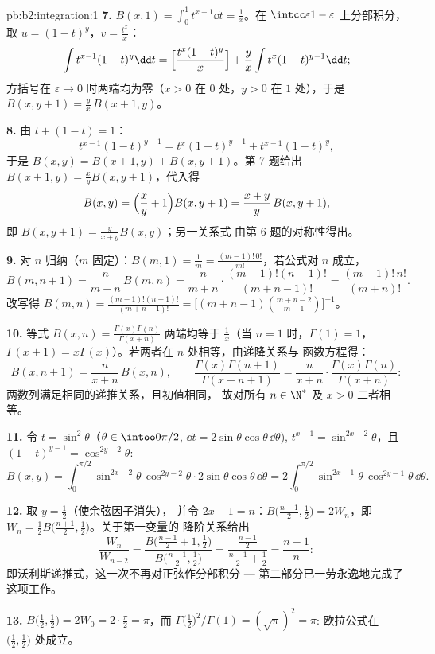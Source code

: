 \begin{solution}{pb:b2:integration:1}
\textbf{7.} $B(x,1) = \int_0^1 t^{x-1}\dd t = \frac1x$。在
$\intcc\varepsilon{1-\varepsilon}$ 上分部积分，取 $u = (1-t)^y$，$v =
\frac{t^x}{x}$：
\[
\int t^{x-1}(1-t)^{y}\dd t
= \Bigl[\frac{t^x(1-t)^y}{x}\Bigr]
+ \frac{y}{x}\int t^{x}(1-t)^{y-1}\dd t ;
\]
方括号在 $\varepsilon \to 0$ 时两端均为零（$x >
0$ 在 $0$ 处，$y > 0$ 在 $1$ 处），于是 $B(x, y+1) = \frac
yx\,B(x+1, y)$。

\textbf{8.} 由 $t + (1-t) = 1$：
\[
t^{x-1}(1-t)^{y-1} = t^{x}(1-t)^{y-1} + t^{x-1}(1-t)^{y},
\]
于是 $B(x,y) = B(x+1,y) + B(x,y+1)$。第 7 题给出 $B(x+1,y) =
\frac xy B(x,y+1)$，代入得
\[
B(x,y) = \Bigl(\frac xy + 1\Bigr)B(x,y+1)
= \frac{x+y}{y}\,B(x,y+1),
\]
即 $B(x,y+1) = \frac{y}{x+y}B(x,y)$；另一关系式
由第 6 题的对称性得出。

\textbf{9.} 对 $n$ 归纳（$m$ 固定）：$B(m,1) = \frac1m =
\frac{(m-1)!\,0!}{m!}$，若公式对 $n$ 成立，
\[
B(m, n+1) = \frac{n}{m+n}\,B(m,n)
= \frac{n}{m+n}\cdot\frac{(m-1)!(n-1)!}{(m+n-1)!}
= \frac{(m-1)!\,n!}{(m+n)!} .
\]
改写得 $B(m,n) = \frac{(m-1)!(n-1)!}{(m+n-1)!} =
\bigl[(m+n-1)\binom{m+n-2}{m-1}\bigr]^{-1}$。

\textbf{10.} 等式 $B(x,n) =
\frac{\Gamma(x)\Gamma(n)}{\Gamma(x+n)}$ 两端均等于 $\frac1x$（当 $n =
1$ 时，$\Gamma(1) = 1$，$\Gamma(x+1) = x\Gamma(x)$）。若两者在
$n$ 处相等，由递降关系与
函数方程得：
\[
B(x, n+1) = \frac{n}{x+n}\,B(x,n), \qquad
\frac{\Gamma(x)\Gamma(n+1)}{\Gamma(x+n+1)}
= \frac{n}{x+n}\cdot
\frac{\Gamma(x)\Gamma(n)}{\Gamma(x+n)} :
\]
两数列满足相同的递推关系，且初值相同，
故对所有 $n \in \N^*$ 及 $x > 0$ 二者相等。

\textbf{11.} 令 $t = \sin^2\theta$（$\theta \in
\intoo0{\pi/2}$, $\dd t = 2\sin\theta\cos\theta\,\dd\theta$),
$t^{x-1} = \sin^{2x-2}\theta$，且 $(1-t)^{y-1} =
\cos^{2y-2}\theta$:
\[
B(x,y) = \int_0^{\pi/2}\sin^{2x-2}\theta\,\cos^{2y-2}\theta
\cdot 2\sin\theta\cos\theta\,\dd\theta
= 2\int_0^{\pi/2}\sin^{2x-1}\theta\,\cos^{2y-1}\theta\,
\dd\theta .
\]

\textbf{12.} 取 $y = \frac12$（使余弦因子消失），
并令 $2x - 1 = n$：$B\bigl(\frac{n+1}2, \frac12\bigr) = 2W_n$，即\
$W_n = \frac12 B\bigl(\frac{n+1}2,\frac12\bigr)$。关于第一变量的
降阶关系给出
\[
\frac{W_n}{W_{n-2}}
= \frac{B\bigl(\frac{n-1}2 + 1, \frac12\bigr)}
{B\bigl(\frac{n-1}2, \frac12\bigr)}
= \frac{\frac{n-1}2}{\frac{n-1}2 + \frac12}
= \frac{n-1}{n} :
\]
即沃利斯递推式，这一次不再对正弦作分部积分 ---
第二部分已一劳永逸地完成了这项工作。

\textbf{13.} $B\bigl(\frac12,\frac12\bigr) = 2W_0 =
2\cdot\frac\pi2 = \pi$，而
$\Gamma\bigl(\frac12\bigr)^2/\Gamma(1) = (\sqrt\pi)^2 = \pi$:
欧拉公式在 $\bigl(\frac12,\frac12\bigr)$ 处成立。


\end{solution}
